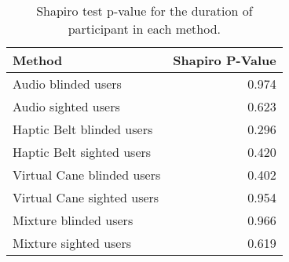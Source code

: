
\begin{table}[!htb]
\centering
\caption{Shapiro test p-value for the duration of participant in each method.}
\label{tab:shapiro_duration}
\begin{tabular}{lr}
\toprule
                    Method &  Shapiro P-Value \\
\midrule
       Audio blinded users &            0.974 \\
       Audio sighted users &            0.623 \\
 Haptic Belt blinded users &            0.296 \\
 Haptic Belt sighted users &            0.420 \\
Virtual Cane blinded users &            0.402 \\
Virtual Cane sighted users &            0.954 \\
     Mixture blinded users &            0.966 \\
     Mixture sighted users &            0.619 \\
\bottomrule
\end{tabular}
\end{table}


